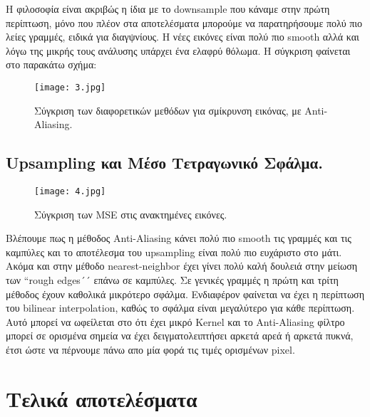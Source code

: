 \documentclass[11pt]{scrartcl} %
\begin{document}
Η φιλοσοφία είναι ακριβώς η ίδια με το downsample που κάναμε στην πρώτη περίπτωση, μόνο που πλέον στα αποτελέσματα μπορούμε να παρατηρήσουμε
πολύ πιο λείες γραμμές, ειδικά για διαγψνίους. Η νέες εικόνες είναι πολύ πιο smooth αλλά και λόγω της μικρής τους ανάλυσης υπάρχει ένα ελαφρύ
θόλωμα. Η σύγκριση φαίνεται στο παρακάτω σχήμα:

\begin{figure}[h] %
	\centering
	\texttt{[image: 3.jpg]} %
	\caption{Σύγκριση των διαφορετικών μεθόδων για σμίκρυνση εικόνας, με Αnti-Αliasing.}
\end{figure}



\subsection{Upsampling και Μέσο Τετραγωνικό Σφάλμα.}

\begin{figure}[h] %
	\centering
	\texttt{[image: 4.jpg]} %
	\caption{Σύγκριση των MSE στις ανακτημένες εικόνες.}
\end{figure}

Βλέπουμε πως η μέθοδος Αnti-Αliasing κάνει πολύ πιο smooth τις γραμμές και τις καμπύλες και το αποτέλεσμα του upsampling είναι πολύ πιο ευχάριστο
στο μάτι. Ακόμα και στην μέθοδο nearest-neighbor έχει γίνει πολύ καλή δουλειά στην μείωση των ``rough edges´´ επάνω σε καμπύλες. Σε γενικές γραμμές
η πρώτη και τρίτη μέθοδος έχουν καθολικά μικρότερο σφάλμα. Ενδιαφέρον φαίνεται να έχει η περίπτωση του bilinear interpolation, καθώς το σφάλμα είναι
μεγαλύτερο για κάθε περίπτωση. Αυτό μπορεί να ωφείλεται στο ότι έχει μικρό Kernel και το Αnti-Αliasing φίλτρο μπορεί σε ορισμένα σημεία να έχει
δειγματολειπτήσει αρκετά αρεά ή αρκετά πυκνά, έτσι ώστε να πέρνουμε πάνω απο μία φορά τις τιμές ορισμένων pixel.


\section{Τελικά αποτελέσματα}
\end{document}
